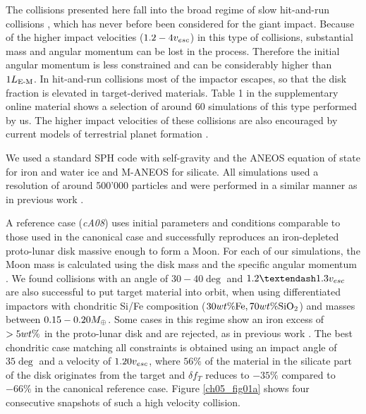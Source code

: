 The collisions presented here fall into the broad regime of slow hit-and-run collisions \citep{Asphaug:2006p3729}, which has never before been considered for the giant impact. Because of the higher impact velocities ($1.2-4 v_{esc}$) in this type of collisions, substantial mass and angular momentum can be lost in the process. Therefore the initial angular momentum is less constrained and can be considerably higher than $1 L_{\textrm{E-M}}$. In hit-and-run collisions most of the impactor escapes, so that the disk fraction is elevated in target-derived materials. Table 1 in the supplementary online material shows a selection of around 60 simulations of this type performed by us. The higher impact velocities of these collisions are also encouraged by current models of terrestrial planet formation \citep{2006Icar..184...39O}. 

We used a standard SPH code with self-gravity and the ANEOS equation of state \citep{1972Thompson} for iron and water ice and M-ANEOS  \citep{Melosh:2007p3502} for silicate. All simulations used a resolution of around 500'000 particles and were performed in a similar manner as in previous work \citep{Benz:1985p1755, Canup:2001p1861, Canup:2001p3295, Canup:2004p115}. 

A reference case (\emph{cA08}) uses initial parameters and conditions comparable to those used in the canonical case \citep{Canup:2004p115} and successfully reproduces an iron-depleted proto-lunar disk massive enough to form a Moon. For each of our simulations, the Moon mass is calculated using the disk mass and the specific angular momentum \citep{Kokubo:2000p2195}. We found collisions with an angle of $30-40\deg$ and $1.2 – 1.3 \vesc$ are also successful to put target material into orbit, when using differentiated impactors with chondritic Si/Fe composition ($30 wt\mathrm{\%} \textrm{Fe}, 70 wt\mathrm{\%} \mathrm{SiO}_2$) and masses between $0.15-0.20 M_{\oplus}$. Some cases in this regime show an iron excess of $> 5 wt\mathrm{\%}$ in the proto-lunar disk and are rejected, as in previous work \citep{Canup:2004p115}. The best chondritic case matching all constraints is obtained using an impact angle of $35 \deg$ and a velocity of $1.20 v_{esc}$, where $56\%$ of the material in the silicate part of the disk originates from the target and $\delta f_{T}$ reduces to $-35\%$ compared to $-66\%$ in the canonical reference case. Figure \ref{ch05_fig01a} shows four consecutive snapshots of such a high velocity collision.

